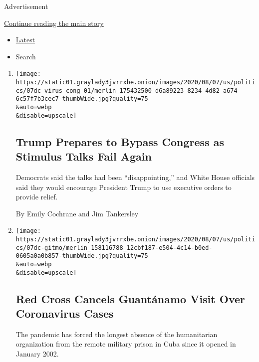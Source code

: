 Advertisement

\protect\hyperlink{after-mid1}{Continue reading the main story}

\begin{itemize}
\tightlist
\item
  \protect\hyperlink{stream-panel}{Latest}
\item
  Search
\end{itemize}

\begin{enumerate}
\def\labelenumi{\arabic{enumi}.}
\item
  \href{/2020/08/07/us/politics/trump-congress-stimulus.html}{}

  \texttt{[image: https://static01.graylady3jvrrxbe.onion/images/2020/08/07/us/politics/07dc-virus-cong-01/merlin\_175432500\_d6a89223-8234-4d82-a674-6c57f7b3cec7-thumbWide.jpg?quality=75\\\&auto=webp\\\&disable=upscale]}

  \hypertarget{trump-prepares-to-bypass-congress-as-stimulus-talks-fail-again}{%
  \subsection{Trump Prepares to Bypass Congress as Stimulus Talks Fail
  Again}\label{trump-prepares-to-bypass-congress-as-stimulus-talks-fail-again}}

  Democrats said the talks had been ``disappointing,'' and White House
  officials said they would encourage President Trump to use executive
  orders to provide relief.

  By Emily Cochrane and Jim Tankersley
\item
  \href{/2020/08/07/us/politics/red-cross-guantanamo-coronavirus.html}{}

  \texttt{[image: https://static01.graylady3jvrrxbe.onion/images/2020/08/07/us/politics/07dc-gitmo/merlin\_158116788\_12cbf187-e504-4c14-b0ed-0605a0a0b857-thumbWide.jpg?quality=75\\\&auto=webp\\\&disable=upscale]}

  \hypertarget{red-cross-cancels-guantuxe1namo-visit-over-coronavirus-cases}{%
  \subsection{Red Cross Cancels Guantánamo Visit Over Coronavirus
  Cases}\label{red-cross-cancels-guantuxe1namo-visit-over-coronavirus-cases}}

  The pandemic has forced the longest absence of the humanitarian
  organization from the remote military prison in Cuba since it opened
  in January 2002.


\end{enumerate}
